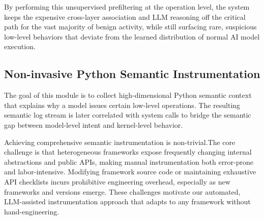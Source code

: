 By performing this unsupervised prefiltering at the operation level, the system keeps the expensive cross-layer association and LLM reasoning off the critical path for the vast majority of benign activity, while still surfacing rare, suspicious low-level behaviors that deviate from the learned distribution of normal AI model execution.


\subsection{Non-invasive Python Semantic Instrumentation}
The goal of this module is to collect high-dimensional Python semantic context that explains why a model issues certain low-level operations. The resulting semantic log stream is later correlated with system calls to bridge the semantic gap between model-level intent and kernel-level behavior.

Achieving comprehensive semantic instrumentation is non-trivial.The core challenge is that heterogeneous frameworks expose frequently changing internal abstractions and public APIs, making manual instrumentation both error-prone and labor-intensive. Modifying framework source code or maintaining exhaustive API checklists incurs prohibitive engineering overhead, especially as new frameworks and versions emerge. These challenges motivate our automated, LLM-assisted instrumentation approach that adapts to any framework without hand-engineering. 

